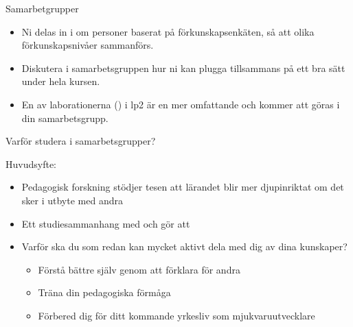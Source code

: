 \fi

\ifkompendium\else



\begin{SlideExtra}{Samarbetgrupper}\footnotesize
\begin{itemize}
\item Ni delas in i  om  personer baserat på förkunskapsenkäten, så att olika förkunskapsnivåer sammanförs.
\item Diskutera i samarbetsgruppen hur ni kan plugga tillsammans på ett bra sätt under hela kursen.
\item En av laborationerna () i lp2 är en mer omfattande  och kommer att göras i din samarbetsgrupp. \\ \vspace{1em}
\end{itemize}
\end{SlideExtra}



\begin{SlideExtra}{Varför studera i samarbetsgrupper?}

Huvudsyfte: 

\begin{itemize}
\item Pedagogisk forskning stödjer tesen att lärandet blir mer djupinriktat om det sker i utbyte med andra
\item Ett studiesammanhang med  och  gör att 
\item Varför ska du som redan kan mycket aktivt dela med dig av dina kunskaper?
\begin{itemize}
\item Förstå bättre själv genom att förklara för andra
\item Träna din pedagogiska förmåga
\item Förbered dig för ditt kommande yrkesliv som mjukvaruutvecklare
\end{itemize}
\end{itemize}
\end{SlideExtra}


